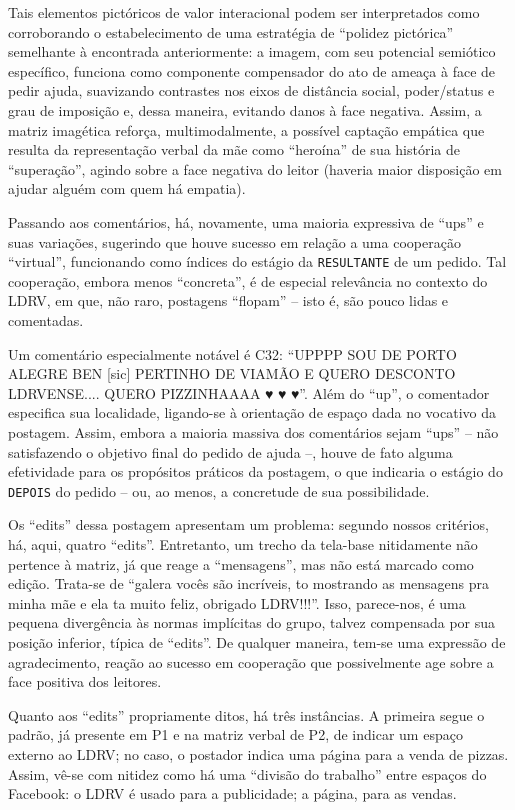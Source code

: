 \documentclass{textolivre-html}
\begin{document}
Tais elementos pictóricos de valor interacional podem ser interpretados como corroborando o estabelecimento de uma estratégia de “polidez pictórica” semelhante à encontrada anteriormente: a imagem, com seu potencial semiótico específico, funciona como componente compensador do ato de ameaça à face de pedir ajuda, suavizando contrastes nos eixos de distância social, poder/status e grau de imposição e, dessa maneira, evitando danos à face negativa. Assim, a matriz imagética reforça, multimodalmente, a possível captação empática que resulta da representação verbal da mãe como “heroína” de sua história de “superação”, agindo sobre a face negativa do leitor (haveria maior disposição em ajudar alguém com quem há empatia).

Passando aos comentários, há, novamente, uma maioria expressiva de “ups” e suas variações, sugerindo que houve sucesso em relação a uma cooperação “virtual”, funcionando como índices do estágio da \texttt{RESULTANTE} de um pedido. Tal cooperação, embora menos “concreta”, é de especial relevância no contexto do LDRV, em que, não raro, postagens “flopam” – isto é, são pouco lidas e comentadas.

Um comentário especialmente notável é C32: “UPPPP SOU DE PORTO ALEGRE BEN [sic] PERTINHO DE VIAMÃO E QUERO DESCONTO LDRVENSE.... QUERO PIZZINHAAAA {\Symbola ♥ ♥ ♥}”. Além do “up”, o comentador especifica sua localidade, ligando-se à orientação de espaço dada no vocativo da postagem. Assim, embora a maioria massiva dos comentários sejam “ups” – não satisfazendo o objetivo final do pedido de ajuda –, houve de fato alguma efetividade para os propósitos práticos da postagem, o que indicaria o estágio do \texttt{DEPOIS} do pedido – ou, ao menos, a concretude de sua possibilidade.

Os “edits” dessa postagem apresentam um problema: segundo nossos critérios, há, aqui, quatro “edits”. Entretanto, um trecho da tela-base nitidamente não pertence à matriz, já que reage a “mensagens”, mas não está marcado como edição. Trata-se de “galera vocês são incríveis, to mostrando as mensagens pra minha mãe e ela ta muito feliz, obrigado LDRV!!!”. Isso, parece-nos, é uma pequena divergência às normas implícitas do grupo, talvez compensada por sua posição inferior, típica de “edits”. De qualquer maneira, tem-se uma expressão de agradecimento, reação ao sucesso em cooperação que possivelmente age sobre a face positiva dos leitores.

Quanto aos “edits” propriamente ditos, há três instâncias. A primeira segue o padrão, já presente em P1 e na matriz verbal de P2, de indicar um espaço externo ao LDRV; no caso, o postador indica uma página para a venda de pizzas. Assim, vê-se com nitidez como há uma “divisão do trabalho” entre espaços do Facebook: o LDRV é usado para a publicidade; a página, para as vendas.
\end{document}
